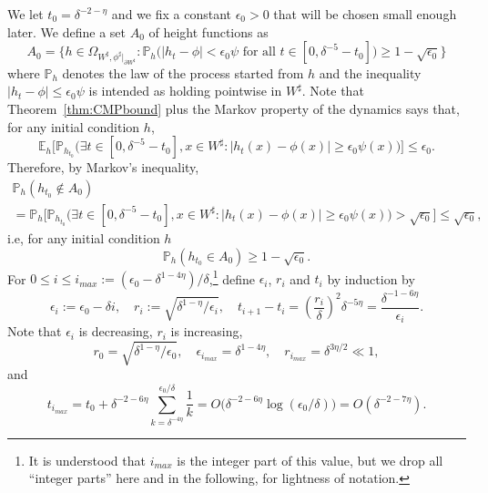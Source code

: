 \documentclass[10pt]{amsart}
\theoremstyle{definition}\newtheorem{defi}[theo]{Definition}\newtheorem{rema}[theo]{Remark}\newtheorem{exam}[theo]{Example}\newtheorem{exem}[theo]{Example}\newtheorem{nota}[theo]{Notation}
\newcommand{\E}{\mathbb{E}}
\renewcommand{\P}{\mathbb{P}}
\newcommand{\eps}{\epsilon}
\renewcommand{\d}{{\sharp }}
\let\oldexists\exists
\renewcommand*{\exists}{\mathrel{\oldexists}}
\begin{document}
We let $t_0=\delta^{-2-\eta}$ and we fix a constant $\epsilon_0>0$ that will be chosen small enough later. We define a set $A_0$ of height functions as
\begin{equation}\label{eq:A}
A_0=\Big\{h\in \Omega_{W^\d,\phi^\d|_{\partial W^\d}}:\P_h\Big(|h_t-\phi|<\epsilon_0\psi\text{ for all }t\in \left[0,\delta^{-5}-t_0\right]\Big)\geq 1 -\sqrt{\epsilon_0}\Big\}
\end{equation}
where $\P_h$ denotes the law of the process started from $h$ and the inequality $|h_t-\phi|\le \epsilon_0\psi$ is intended as holding pointwise in $W^\d$. Note that Theorem~\ref{thm:CMPbound} plus the Markov property of the dynamics says that, for any initial condition $h$,
\begin{equation}
\E_h\Big[\P_{h_{t_0}}\Big(\exists t\in \left[0,\delta^{-5}-t_0\right],x\in W^\d:|h_t(x)-\phi(x)|\geq\epsilon_0\psi(x)\Big)\Big]\le
\epsilon_0.
\end{equation}
Therefore, by Markov's inequality,
\begin{multline}
\P_h(h_{t_0}\not\in A_0)\\
=\P_h\Big[\P_{h_{t_0}}\Big(\exists t\in \left[0,\delta^{-5}-t_0\right],x\in W^\d:|h_t(x)-\phi(x)|\ge \epsilon_0 \psi(x)\Big)>\sqrt{\epsilon_0}\Big]\le \sqrt{\epsilon_0},
\end{multline}
i.e, for any initial condition $h$
\begin{equation}\label{eq:ie}
\P_h(h_{t_0}\in A_0)\ge 1-\sqrt{\epsilon_0}.
\end{equation}
For $0\le i\le i_{max}:=(\epsilon_0-\delta^{1-4\eta})/\delta$,\footnote{It is understood that $i_{max}$ is the integer part of this value, but we drop all ``integer parts'' here and in the following, for lightness of notation.} define $\eps_i$, $r_i$ and $t_i$ by induction by
\begin{equation}\label{eq:ri}
\epsilon_i:=\epsilon_0-\delta i, \quad r_i := \sqrt{\delta^{1-\eta}/\epsilon_i}, \quad t_{i+1}-t_i=\left(\frac{r_i}\delta\right)^{2}\delta^{-5\eta}= \frac{\delta^{-1-6\eta}}{\epsilon_i}.
\end{equation}
Note that $\eps_i$ is decreasing, $r_i$ is increasing,
\begin{equation}\label{eq:r0rimax}
r_0 = \sqrt{\delta^{1-\eta}/\epsilon_0}, \quad \epsilon_{i_{max}}=\delta^{1-4\eta}, \quad r_{i_{max}}= \delta^{3\eta/2}\ll 1,
\end{equation}
and
\begin{equation}\label{eq:tmax}
t_{i_{max}}=t_0+\delta^{-2-6\eta}\sum_{k=\delta^{-4\eta}}^{\epsilon_0/\delta}\frac1k= O\Big(\delta^{-2-6\eta}\log(\epsilon_0/\delta)\Big)=O(\delta^{-2-7\eta}).
\end{equation}
\end{document}
